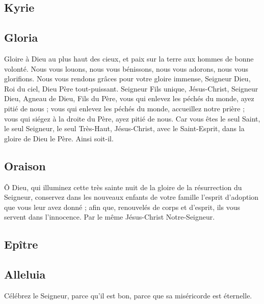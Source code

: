 \documentclass[%
fontsize=11%
,a5paper%
,DIV=15%
]{scrartcl}
\begin{document}
\subsection*{Kyrie}
\subsection*{Gloria}

Gloire à Dieu au plus haut des cieux, et paix sur la terre aux hommes de bonne volonté. 
Nous vous louons, nous vous bénissons, nous vous adorons, nous vous glorifions. 
Nous vous rendons grâces pour votre gloire immense, Seigneur Dieu, Roi du ciel, Dieu Père tout-puissant. 
Seigneur Fils unique, Jésus-Christ, Seigneur Dieu, Agneau de Dieu, Fils du Père, vous qui enlevez les péchés du monde, ayez pitié de nous ; vous qui enlevez les péchés du monde, accueillez notre prière ; vous qui siégez à la droite du Père, ayez pitié de nous. 
Car vous êtes le seul Saint, le seul Seigneur, le seul Très-Haut, Jésus-Christ, avec le Saint-Esprit, dans la gloire de Dieu le Père. Ainsi soit-il.

\subsection*{Oraison}
Ô Dieu, qui illuminez cette très sainte nuit de la gloire de la résurrection du Seigneur, conservez dans les nouveaux enfants de votre famille l’esprit d’adoption que vous leur avez donné ; afin que, renouvelés de corps et d’esprit, ils vous servent dans l’innocence. Par le même Jésus-Christ Notre-Seigneur.

\subsection*{Epître}

\subsection*{Alleluia}
Célébrez le Seigneur, parce qu’il est bon, parce que sa miséricorde est éternelle.
\end{document}
